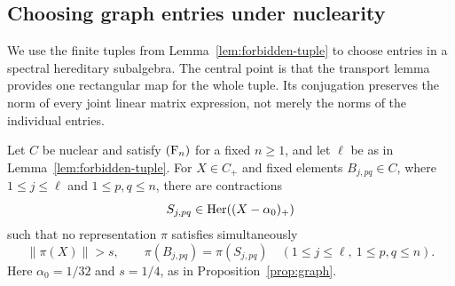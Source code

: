 \subsection{Choosing graph entries under nuclearity}

We use the finite tuples from Lemma~\ref{lem:forbidden-tuple} to
choose entries in a spectral hereditary subalgebra.  The central
point is that the transport lemma provides one rectangular map for
the whole tuple.  Its conjugation preserves the norm of every joint linear
matrix expression, not merely the norms of the individual entries.

\begin{proposition}
\label{prop:nuclear-avoidance}
Let \(C\) be nuclear and satisfy \(\textup{(F\ensuremath{_n})}\) for a fixed \(n\ge1\),
and let \(\ell\) be as in Lemma~\ref{lem:forbidden-tuple}.  For
\(X\in C_+\) and fixed elements
\(B_{j,pq}\in C\), where \(1\le j\le\ell\) and \(1\le p,q\le n\),
there are contractions
\[
 S_{j,pq}\in\operatorname{Her}((X-\alpha_0)_+)
\]
such that no representation \(\pi\) satisfies simultaneously
\begin{equation}\label{eq:nuclear-forbidden}
 \|\pi(X)\|>s,\qquad
 \pi(B_{j,pq})=\pi(S_{j,pq})
 \quad(1\le j\le\ell,\ 1\le p,q\le n).
\end{equation}
Here \(\alpha_0=1/32\) and \(s=1/4\), as in
Proposition~\ref{prop:graph}.
\end{proposition}


